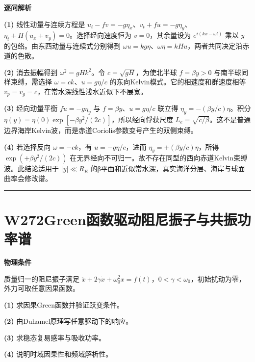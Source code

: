 \documentclass[UTF8,a4paper,11pt,oneside,openany]{ctexbook}
\begin{document}
\par\medskip\noindent\textbf{逐问解析}
\par\noindent\textbf{(1)} 线性动量与连续方程是 \(u_t-fv=-g\eta_x\)、\(v_t+fu=-g\eta_y\)、\(\eta_t+H(u_x+v_y)=0\)。选择经向速度恒为 \(v=0\)，其余量设为 \(e^{i(kx-\omega t)}\) 乘以 \(y\) 的包络。由东西动量与连续式分别得到 \(\omega u=kg\eta\)、\(\omega\eta=kHu\)，两者共同决定沿赤道的色散。
\par\noindent\textbf{(2)} 消去振幅得到 \(\omega^2=gHk^2\)。令 \(c=\sqrt{gH}\)，为使北半球 \(f=\beta y>0\) 与南半球同样束缚，需选择 \(\omega=ck\)、\(u=g\eta/c\) 的东向Kelvin模式。它的相速度和群速度相等 \(v_p=v_g=c\)，在常水深线性浅水近似下不展宽。
\par\noindent\textbf{(3)} 经向动量平衡 \(fu=-g\eta_y\) 与 \(f=\beta y\)、\(u=g\eta/c\) 联立得 \(\eta_y=-(\beta y/c)\eta\)。积分 \(\eta(y)=\eta(0)\exp[-\beta y^2/(2c)]\)，所以经向俘获尺度 \(L_e=\sqrt{c/\beta}\)。这不是普通边界海岸Kelvin波，而是赤道Coriolis参数变号产生的双侧束缚。
\par\noindent\textbf{(4)} 若选择反向 \(\omega=-ck\)，有 \(u=-g\eta/c\)，进而 \(\eta_y=+(\beta y/c)\eta\)，所得 \(\exp(+\beta y^2/(2c))\) 在无界经向不可归一。故不存在同型的西向赤道Kelvin束缚波。此结论适用于 \(|y|\ll R_E\) 的β平面和近似常水深，真实海洋分层、海岸与球面曲率会修改谱。

\par\bigskip\hrule\bigskip
\section*{W272\quad Green函数驱动阻尼振子与共振功率谱}
\textbf{物理条件}\par 质量归一的阻尼振子满足 \(\ddot x+2\gamma\dot x+\omega_0^2x=f(t)\)，\(0<\gamma<\omega_0\)，初始扰动为零，外力可取任意因果函数。
\par\noindent\textbf{(1)} 求因果Green函数并验证跃变条件。
\par\noindent\textbf{(2)} 由Duhamel原理写任意驱动下的响应。
\par\noindent\textbf{(3)} 求稳态复易感率与吸收功率。
\par\noindent\textbf{(4)} 说明时域因果性和频域解析性。
\end{document}
